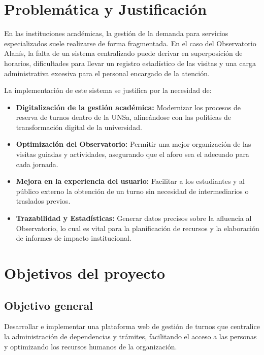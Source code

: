 \section{Problemática y Justificación}
En las instituciones académicas, la gestión de la demanda para servicios especializados suele realizarse de forma fragmentada. En el caso del Observatorio Alanís, la falta de un sistema centralizado puede derivar en superposición de horarios, dificultades para llevar un registro estadístico de las visitas y una carga administrativa excesiva para el personal encargado de la atención.

La implementación de este sistema se justifica por la necesidad de:
\begin{itemize}
    \item \textbf{Digitalización de la gestión académica:} Modernizar los procesos de reserva de turnos dentro de la UNSa, alineándose con las políticas de transformación digital de la universidad.
    \item \textbf{Optimización del Observatorio:} Permitir una mejor organización de las visitas guiadas y actividades, asegurando que el aforo sea el adecuado para cada jornada.
    \item \textbf{Mejora en la experiencia del usuario:} Facilitar a los estudiantes y al público externo la obtención de un turno sin necesidad de intermediarios o traslados previos.
    \item \textbf{Trazabilidad y Estadísticas:} Generar datos precisos sobre la afluencia al Observatorio, lo cual es vital para la planificación de recursos y la elaboración de informes de impacto institucional.
\end{itemize}

\section{Objetivos del proyecto}

\subsection{Objetivo general}
Desarrollar e implementar una plataforma web de gestión de turnos que centralice la administración de dependencias y trámites, facilitando el acceso a las personas y optimizando los recursos humanos de la organización.

